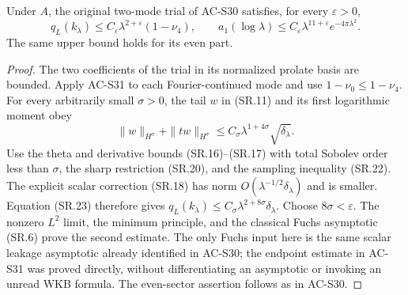 \begin{corollary}
\label{AC-S32}
Under $A$, the original two-mode trial of AC-S30 satisfies,
for every $\varepsilon>0$,
\[
 q_L(k_\lambda)\leq C_\varepsilon
                     \lambda^{2+\varepsilon}(1-\nu_4),
 \qquad
 a_1(\log\lambda)\leq C_\varepsilon
                  \lambda^{11+\varepsilon}e^{-4\pi\lambda^2}.
                                                        \tag{SE.13}
\]
The same upper bound holds for its even part.
\end{corollary}
\begin{proof}
The two coefficients of the trial in its normalized
prolate basis are bounded.  Apply AC-S31 to each
Fourier-continued mode and use $1-\nu_0\leq1-\nu_4$.
For every arbitrarily small $\sigma>0$, the tail $w$
in (SR.11) and its first logarithmic moment obey
\[
       \|w\|_{H^\sigma}+\|tw\|_{H^\sigma}
               \leq C_\sigma\lambda^{1+4\sigma}\sqrt{\delta_\lambda}.
\]
Use the theta and derivative bounds (SR.16)--(SR.17)
with total Sobolev order less than $\sigma$, the
sharp restriction (SR.20), and the sampling inequality
(SR.22).  The explicit scalar correction (SR.18)
has norm $O(\lambda^{-1/2}\delta_\lambda)$ and is
smaller.  Equation (SR.23) therefore gives
$q_L(k_\lambda)\leq C_\sigma\lambda^{2+8\sigma}\delta_\lambda$.
Choose $8\sigma<\varepsilon$.
The nonzero $L^2$ limit, the minimum principle,
and the classical Fuchs asymptotic (SR.6) prove
the second estimate.  The only Fuchs input here
is the same scalar leakage asymptotic already
identified in AC-S30; the endpoint estimate in
AC-S31 was proved directly, without differentiating
an asymptotic or invoking an unread WKB formula.
The even-sector assertion follows as in AC-S30.
\end{proof}

